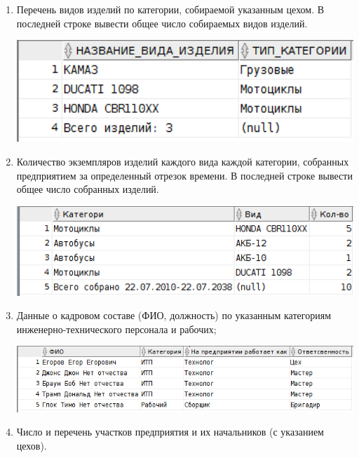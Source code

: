 \begin{enumerate}

    \item Перечень видов изделий по категории, собираемой указанным цехом.
    В последней строке вывести общее число собираемых видов изделий.

    

    \includegraphics[width=14cm]{./screenshots/results/result1.png}

    \item Количество экземпляров изделий каждого вида каждой категории, собранных предприятием за определенный отрезок времени.
    В последней строке вывести общее число собранных изделий.

    

    \includegraphics[width=14cm]{./screenshots/results/result2.png}

    \item Данные о кадровом составе (ФИО, должность) по указанным категориям инженерно-технического персонала и рабочих;

    

    \includegraphics[width=14cm]{./screenshots/results/result3.png}

    \item Число и перечень участков предприятия и их начальников (с указанием цехов).


\end{enumerate}
